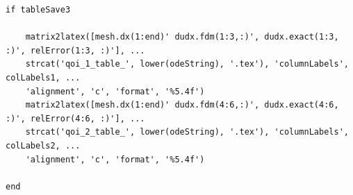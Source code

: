 \documentclass[10pt, reqno]{article}		%
\numberwithin{equation}{section}
\begin{document}
\begin{lstlisting}
if tableSave3

	matrix2latex([mesh.dx(1:end)' dudx.fdm(1:3,:)', dudx.exact(1:3, :)', relError(1:3, :)'], ...
	strcat('qoi_1_table_', lower(odeString), '.tex'), 'columnLabels', colLabels1, ...
	'alignment', 'c', 'format', '%5.4f')
	matrix2latex([mesh.dx(1:end)' dudx.fdm(4:6,:)', dudx.exact(4:6, :)', relError(4:6, :)'], ...
	strcat('qoi_2_table_', lower(odeString), '.tex'), 'columnLabels', colLabels2, ...
	'alignment', 'c', 'format', '%5.4f')

end
\end{lstlisting}
\end{document}
